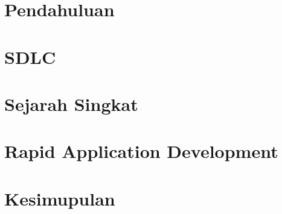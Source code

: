 \documentclass[12pt]{article}
\begin{document}
    

    
    \tableofcontents
    
    \newpage

    \section{Pendahuluan}
    
    
    \newpage
    
    \begin{multicols}{2}
        \section{SDLC}
        
    
        \section{Sejarah Singkat}
        
        
        \section{Rapid Application Development}
        
    
    \end{multicols}

    \newpage

    \section{Kesimupulan}
    

    \newpage

    \printbibliography
 
\end{document}
